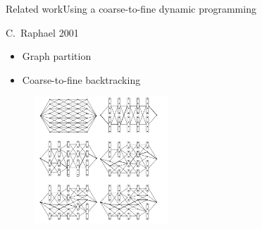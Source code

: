 \begin{frame}{Related work}{Using a coarse-to-fine dynamic programming}
\begin{block}{C.~Raphael 2001\cite{Raphael2001}}
\begin{itemize}
\item Graph partition
\item Coarse-to-fine backtracking
\end{itemize}
\end{block}
\begin{figure}
	\centering
	\includegraphics[width = 0.45\textwidth]{./figure/coarse_to_fine_DP}
\end{figure}
\end{frame}




